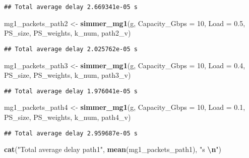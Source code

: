 \documentclass[
]{article}
\newenvironment{Shaded}{\begin{snugshade}}{\end{snugshade}}
\newcommand{\AttributeTok}[1]{\textcolor[rgb]{0.13,0.29,0.53}{#1}}
\newcommand{\DecValTok}[1]{\textcolor[rgb]{0.00,0.00,0.81}{#1}}
\newcommand{\FloatTok}[1]{\textcolor[rgb]{0.00,0.00,0.81}{#1}}
\newcommand{\FunctionTok}[1]{\textcolor[rgb]{0.13,0.29,0.53}{\textbf{#1}}}
\newcommand{\NormalTok}[1]{#1}
\newcommand{\OtherTok}[1]{\textcolor[rgb]{0.56,0.35,0.01}{#1}}
\newcommand{\SpecialCharTok}[1]{\textcolor[rgb]{0.81,0.36,0.00}{\textbf{#1}}}
\newcommand{\StringTok}[1]{\textcolor[rgb]{0.31,0.60,0.02}{#1}}
\begin{document}
\begin{verbatim}
## Total average delay 2.669341e-05 s
\end{verbatim}

\begin{Shaded}
\begin{Highlighting}[]
\NormalTok{mg1\_packets\_path2 }\OtherTok{\textless{}{-}} \FunctionTok{simmer\_mg1}\NormalTok{(g, }\AttributeTok{Capacity\_Gbps =} \DecValTok{10}\NormalTok{, }\AttributeTok{Load =} \FloatTok{0.5}\NormalTok{, PS\_size, PS\_weights, k\_num, path2\_v)}
\end{Highlighting}
\end{Shaded}

\begin{verbatim}
## Total average delay 2.025762e-05 s
\end{verbatim}

\begin{Shaded}
\begin{Highlighting}[]
\NormalTok{mg1\_packets\_path3 }\OtherTok{\textless{}{-}} \FunctionTok{simmer\_mg1}\NormalTok{(g, }\AttributeTok{Capacity\_Gbps =} \DecValTok{10}\NormalTok{, }\AttributeTok{Load =} \FloatTok{0.4}\NormalTok{, PS\_size, PS\_weights, k\_num, path3\_v)}
\end{Highlighting}
\end{Shaded}

\begin{verbatim}
## Total average delay 1.976041e-05 s
\end{verbatim}

\begin{Shaded}
\begin{Highlighting}[]
\NormalTok{mg1\_packets\_path4 }\OtherTok{\textless{}{-}} \FunctionTok{simmer\_mg1}\NormalTok{(g, }\AttributeTok{Capacity\_Gbps =} \DecValTok{10}\NormalTok{, }\AttributeTok{Load =} \FloatTok{0.1}\NormalTok{, PS\_size, PS\_weights, k\_num, path4\_v)}
\end{Highlighting}
\end{Shaded}

\begin{verbatim}
## Total average delay 2.959687e-05 s
\end{verbatim}

\begin{Shaded}
\begin{Highlighting}[]
\FunctionTok{cat}\NormalTok{(}\StringTok{"Total average delay path1"}\NormalTok{, }\FunctionTok{mean}\NormalTok{(mg1\_packets\_path1), }\StringTok{"s }\SpecialCharTok{\textbackslash{}n}\StringTok{"}\NormalTok{)}
\end{Highlighting}
\end{Shaded}
\end{document}
